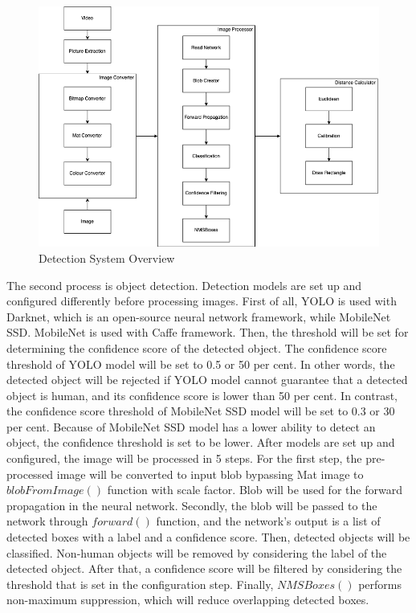         \begin{figure}[!ht]
            \centering
            \includegraphics[width=5in]{images/chapter3/system-overview.png}
            \caption{Detection System Overview}
            \label{systemOverview}
        \end{figure}

        The second process is object detection.
        Detection models are set up and configured differently before processing images.
        First of all, YOLO is used with Darknet, which is an open-source neural network framework,
            while MobileNet SSD. MobileNet is used with Caffe framework.
        Then, the threshold will be set for determining the confidence score of the detected object.
            The confidence score threshold of YOLO model will be set to 0.5 or 50 per cent.
            In other words, the detected object will be rejected if YOLO model cannot guarantee that a detected object is human,
            and its confidence score is lower than 50 per cent.
            In contrast, the confidence score threshold of MobileNet SSD model will be set to 0.3 or 30 per cent.
            Because of MobileNet SSD model has a lower ability to detect an object, the confidence threshold is set to be lower.
        After models are set up and configured, the image will be processed in 5 steps.
        For the first step, the pre-processed image will be converted to input blob bypassing Mat image to $blobFromImage()$ function with scale factor.
            Blob will be used for the forward propagation in the neural network.
        Secondly, the blob will be passed to the network through $forward()$ function,
            and the network's output is a list of detected boxes with a label and a confidence score.
        Then, detected objects will be classified.
            Non-human objects will be removed by considering the label of the detected object.
        After that, a confidence score will be filtered by considering the threshold that is set in the configuration step.
        Finally, $NMSBoxes()$ performs non-maximum suppression, which will reduce overlapping detected boxes.

